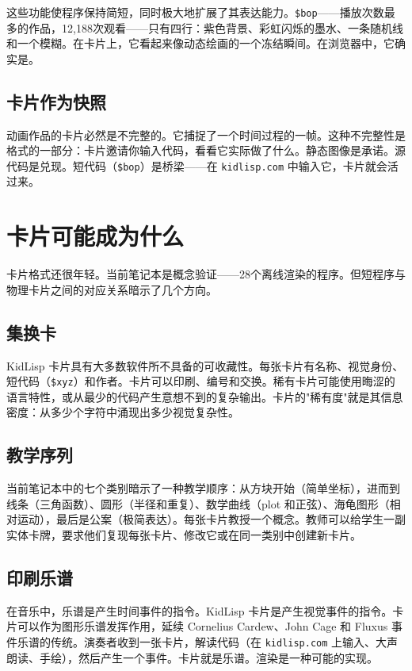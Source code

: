 \documentclass[10pt,letterpaper,twocolumn]{article}
\begin{document}
这些功能使程序保持简短，同时极大地扩展了其表达能力。\texttt{\$bop}------播放次数最多的作品，12,188次观看------只有四行：紫色背景、彩虹闪烁的墨水、一条随机线和一个模糊。在卡片上，它看起来像动态绘画的一个冻结瞬间。在浏览器中，它确实是。

\subsection{卡片作为快照}

动画作品的卡片必然是不完整的。它捕捉了一个时间过程的一帧。这种不完整性是格式的一部分：卡片邀请你输入代码，看看它实际做了什么。静态图像是承诺。源代码是兑现。短代码（\texttt{\$bop}）是桥梁------在 \texttt{kidlisp.com} 中输入它，卡片就会活过来。


\section{卡片可能成为什么}
\label{sec:futures}

卡片格式还很年轻。当前笔记本是概念验证------28个离线渲染的程序。但短程序与物理卡片之间的对应关系暗示了几个方向。

\subsection{集换卡}

KidLisp 卡片具有大多数软件所不具备的可收藏性。每张卡片有名称、视觉身份、短代码（\texttt{\$xyz}）和作者。卡片可以印刷、编号和交换。稀有卡片可能使用晦涩的语言特性，或从最少的代码产生意想不到的复杂输出。卡片的"稀有度"就是其信息密度：从多少个字符中涌现出多少视觉复杂性。

\subsection{教学序列}

当前笔记本中的七个类别暗示了一种教学顺序：从方块开始（简单坐标），进而到线条（三角函数）、圆形（半径和重复）、数学曲线（plot 和正弦）、海龟图形（相对运动），最后是公案（极简表达）。每张卡片教授一个概念。教师可以给学生一副实体卡牌，要求他们复现每张卡片、修改它或在同一类别中创建新卡片。

\subsection{印刷乐谱}

在音乐中，乐谱是产生时间事件的指令。KidLisp 卡片是产生视觉事件的指令。卡片可以作为图形乐谱发挥作用，延续 Cornelius Cardew、John Cage 和 Fluxus 事件乐谱的传统。演奏者收到一张卡片，解读代码（在 \texttt{kidlisp.com} 上输入、大声朗读、手绘），然后产生一个事件。卡片就是乐谱。渲染是一种可能的实现。
\end{document}
